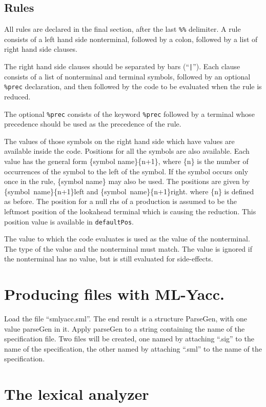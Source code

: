 \subsection{Rules}

All rules are declared in the final section, after the last {\tt \%\%}
delimiter.  A rule consists of a left hand side nonterminal, followed by
a colon, followed by a list of right hand side clauses. 

The right hand side clauses should be separated by bars (``{\tt |}'').  Each
clause consists of a list of nonterminal and terminal symbols, followed
by an optional {\tt \%prec} declaration, and then followed by the code to be
evaluated when the rule is reduced.

The optional {\tt \%prec} consists of the keyword {\tt \%prec} followed by a 
terminal whose precedence should be used as the precedence of the
rule.

The values of those symbols on the right hand side which have values are 
available inside the code.  Positions for all the symbols are also
available.
Each value has the general form \{symbol name\}\{n+1\}, where \{n\} is the 
number of occurrences of the symbol to the left of the symbol.  If
the symbol occurs only once in the rule, \{symbol name\} may also 
be used.
The positions are given by \{symbol~name\}\{n+1\}left and
\{symbol~name\}\{n+1\}right.  where \{n\} is defined as before.
The position for a null rhs of
a production is assumed to be the leftmost position of the lookahead
terminal which is causing the reduction. This position value is
available in {\tt defaultPos}.

The value to which the code evaluates is used as the value of the
nonterminal.  The type of the value and the nonterminal must match.
The value is ignored if the nonterminal has no value, but is still
evaluated for side-effects.

\section{Producing files with ML-Yacc.}

Load the file ``smlyacc.sml''.  The end result is a structure ParseGen, with
one value parseGen in it.  Apply parseGen to a string containing the name
of the specification file.  Two files will be created, one named by
attaching ``.sig'' to the name of the specification, the other named by
attaching ``.sml'' to the name of the specification.

\section{The lexical analyzer}

